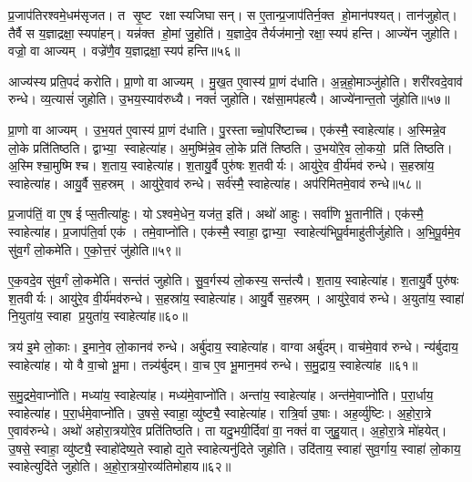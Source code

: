 प्र॒जाप॑तिरश्वमे॒धम॑सृजत। त सृ॒ष्ट रक्षास्यजिघासन्। स ए॒तान्प्र॒जाप॑तिर्न॒क्त हो॒मान॑पश्यत्। तान॑जुहोत्। तैर्वै स य॒ज्ञाद्रक्षा॒स्यपा॑हन्। यन्न॑क्त हो॒मां जु॒होति॑। य॒ज्ञादे॒व तैर्यज॑मानो॒ रक्षा॒स्यप॑ हन्ति। आज्ये॑न जुहोति। वज्रो॒ वा आज्यम्। वज्रे॑णै॒व य॒ज्ञाद्रक्षा॒स्यप॑ हन्ति॥५६॥

आज्य॑स्य प्रति॒पदं॑ करोति। प्रा॒णो वा आज्यम्। मु॒ख॒त ए॒वास्य॑ प्रा॒णं द॑धाति। अ॒न्न॒हो॒माञ्जु॑होति। शरी॑रवदे॒वाव॑ रुन्धे। व्य॒त्यासं॑ जुहोति। उ॒भय॒स्याव॑रुध्यै। नक्तं॑ जुहोति। रक्ष॑सा॒मप॑हत्यै। आज्ये॑नान्त॒तो जु॑होति॥५७॥

प्रा॒णो वा आज्यम्। उ॒भ॒यत॑ ए॒वास्य॑ प्रा॒णं द॑धाति। पु॒रस्ताच्चो॒परि॑ष्टाच्च। एक॑स्मै॒ स्वाहेत्या॑ह। अ॒स्मिन्ने॒व लो॒के प्रति॑तिष्ठति। द्वाभ्या॒ स्वाहेत्या॑ह। अ॒मुष्मि॑न्ने॒व लो॒के प्रति॑ तिष्ठति। उ॒भयो॑रे॒व लो॒कयो॒ प्रति॑ तिष्ठति। अ॒स्मिश्चा॒मुष्मिश्च। श॒ताय॒ स्वाहेत्या॑ह। श॒तायु॒र्वै पुरु॑षः श॒तवीर्यः। आयु॑रे॒व वी॒र्य॑मव॑ रुन्धे। स॒हस्रा॑य॒ स्वाहेत्या॑ह। आयु॒र्वै स॒हस्रम्। आयु॑रे॒वाव॑ रुन्धे। सर्व॑स्मै॒ स्वाहेत्या॑ह। अप॑रिमितमे॒वाव॑ रुन्धे॥५८॥\anuvakamend[ए॒व य॒ज्ञाद्रक्षा॒स्यप॑हन्त्यन्त॒तो जु॑होति श॒ताय॒ स्वाहेत्या॑ह स॒प्त च॑]

प्र॒जाप॑तिं॒ वा ए॒ष ईप्स॒तीत्या॑हुः। योऽश्वमे॒धेन॒ यज॑त॒ इति॑। अथो॑ आहुः। सर्वा॑णि भू॒तानीति॑। एक॑स्मै॒ स्वाहेत्या॑ह। प्र॒जाप॑ति॒र्वा एक॑। तमे॒वाप्नो॑ति। एक॑स्मै॒ स्वाहा॒ द्वाभ्या॒ स्वाहेत्य॑भिपू॒र्वमाहु॑तीर्जुहोति। अ॒भि॒पू॒र्वमे॒व सु॑व॒र्गं लो॒कमे॑ति। ए॒को॒त्त॒रं जु॑होति॥५९॥

ए॒क॒वदे॒व सु॑व॒र्गं लो॒कमे॑ति। सन्त॑तं जुहोति। सु॒व॒र्गस्य॑ लो॒कस्य॒ सन्त॑त्यै। श॒ताय॒ स्वाहेत्या॑ह। श॒तायु॒र्वै पुरु॑षः श॒तवीर्यः। आयु॑रे॒व वी॒र्य॑मव॑रुन्धे। स॒हस्रा॑य॒ स्वाहेत्या॑ह। आयु॒र्वै स॒हस्रम्। आयु॑रे॒वाव॑ रुन्धे। अ॒युता॑य॒ स्वाहा॑ नि॒युता॑य॒ स्वाहा प्र॒युता॑य॒ स्वाहेत्या॑ह॥६०॥

त्रय॑ इ॒मे लो॒काः। इ॒माने॒व लो॒कानव॑ रुन्धे। अर्बु॑दाय॒ स्वाहेत्या॑ह। वाग्वा अर्बु॑दम्। वाच॑मे॒वाव॑ रुन्धे। न्य॑र्बुदाय॒ स्वाहेत्या॑ह। यो वै वा॒चो भू॒मा। तन्न्य॑र्बुदम्। वा॒च ए॒व भू॒मान॒मव॑ रुन्धे। स॒मु॒द्राय॒ स्वाहेत्या॑ह ॥६१॥

स॒मु॒द्रमे॒वाप्नो॑ति। मध्या॑य॒ स्वाहेत्या॑ह। मध्य॑मे॒वाप्नो॑ति। अन्ता॑य॒ स्वाहेत्या॑ह। अन्त॑मे॒वाप्नो॑ति। प॒रा॒र्धाय॒ स्वाहेत्या॑ह। प॒रा॒र्धमे॒वाप्नो॑ति। उ॒षसे॒ स्वाहा॒ व्यु॑ष्ट्यै॒ स्वाहेत्या॑ह। रात्रि॒र्वा उ॒षाः। अह॒र्व्यु॑ष्टिः। अ॒हो॒रा॒त्रे ए॒वाव॑रुन्धे। अथो॑ अहोरा॒त्रयो॑रे॒व प्रति॑तिष्ठति। ता यदु॒भयी॒र्दिवा॑ वा॒ नक्तं॑ वा जुहु॒यात्। अ॒हो॒रा॒त्रे मो॑हयेत्। उ॒षसे॒ स्वाहा॒ व्यु॑ष्ट्यै॒ स्वाहो॑देष्य॒ते स्वाहोद्य॒ते स्वाहेत्यनु॑दिते जुहोति। उदि॑ताय॒ स्वाहा॑ सुव॒र्गाय॒ स्वाहा॑ लो॒काय॒ स्वाहेत्युदि॑ते जुहोति। अ॒हो॒रा॒त्रयो॒रव्य॑तिमोहाय॥६२॥\anuvakamend[ए॒को॒त्त॒रं जु॑होति प्र॒युता॑य॒ स्वाहेत्या॑ह समु॒द्राय॒ स्वाहेत्या॒हाह॒र्व्यु॑ष्टिः स॒प्त च॑]

